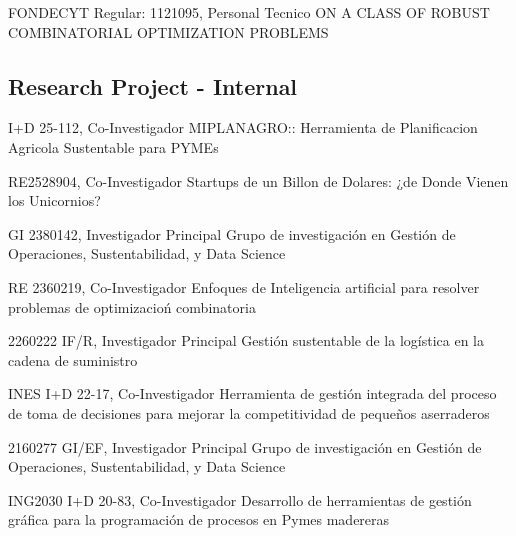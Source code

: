 {FONDECYT Regular: 1121095, Personal Tecnico}
{ON A CLASS OF ROBUST COMBINATORIAL OPTIMIZATION PROBLEMS}

\subsection{Research Project - Internal}

{I+D 25-112, Co-Investigador}
{MIPLANAGRO:: Herramienta de Planificacion Agricola Sustentable para PYMEs}

{RE2528904, Co-Investigador}
{Startups de un Billon de Dolares: ¿de Donde Vienen los Unicornios?}

{GI 2380142, Investigador Principal}
{Grupo de investigaci\'on en Gesti\'on de Operaciones, Sustentabilidad, y Data Science}

{RE 2360219, Co-Investigador}
{Enfoques de Inteligencia artificial para resolver problemas de optimizacio\'n combinatoria}

{2260222 IF/R, Investigador Principal}
{Gesti\'on sustentable de la log\'istica en la cadena de suministro}

{INES I+D 22-17, Co-Investigador}
{Herramienta de gesti\'on integrada del proceso de toma de decisiones para mejorar la competitividad de peque\~nos aserraderos}

{2160277 GI/EF, Investigador Principal}
{Grupo de investigaci\'on en Gesti\'on de Operaciones, Sustentabilidad, y Data Science}

{ING2030 I+D 20-83, Co-Investigador}
{Desarrollo de herramientas de gesti\'on gr\'afica para la programaci\'on de procesos en Pymes madereras}

